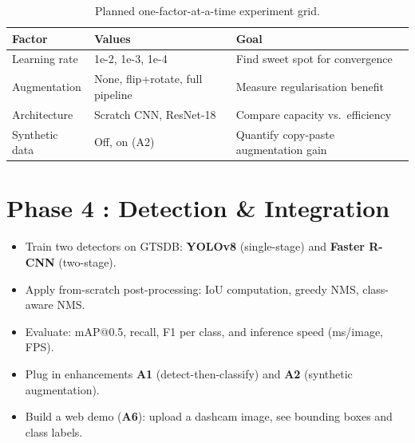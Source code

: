 \documentclass[12pt,a4paper]{article}
\begin{document}
\begin{table}[H]
\centering\small
\renewcommand{\arraystretch}{1.3}
\caption{Planned one-factor-at-a-time experiment grid.}
\begin{tabularx}{\textwidth}{l l X}
\toprule
\textbf{Factor} & \textbf{Values} & \textbf{Goal} \\
\midrule
Learning rate    & 1e-2, 1e-3, 1e-4   & Find sweet spot for convergence \\
Augmentation     & None, flip+rotate, full pipeline & Measure regularisation benefit \\
Architecture     & Scratch CNN, ResNet-18 & Compare capacity vs.\ efficiency \\
Synthetic data   & Off, on (A2)       & Quantify copy-paste augmentation gain \\
\bottomrule
\end{tabularx}
\end{table}

\section*{Phase 4 : Detection \& Integration}

\begin{phasebox}[title={EF3 / EF4 / EF5: Detection + Post-Processing + Demo}]
\begin{itemize}[leftmargin=1.2em, itemsep=3pt]
  \item Train two detectors on GTSDB: \textbf{YOLOv8} (single-stage) and \textbf{Faster R-CNN} (two-stage).
  \item Apply from-scratch post-processing: IoU computation, greedy NMS, class-aware NMS.
  \item Evaluate: mAP@0.5, recall, F1 per class, and inference speed (ms/image, FPS).
  \item Plug in enhancements \textbf{A1} (detect-then-classify) and \textbf{A2} (synthetic augmentation).
  \item Build a web demo (\textbf{A6}): upload a dashcam image, see bounding boxes and class labels.
\end{itemize}
\end{phasebox}
\end{document}

